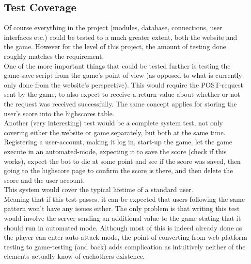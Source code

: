 \documentclass[12pt]{report}
\begin{document}
\subsection*{Test Coverage}
Of course everything in the project (modules, database, connections, user interfaces etc.) could be tested to a much greater extent, both the website and the game. However for the level of this project, the amount of testing done roughly matches the requirement.\\
One of the more important things that could be tested further is testing the game-save script from the game's point of view (as opposed to what is currently only done from the website's perspective). This would require the POST-request sent by the game, to also expect to receive a return value about whether or not the request was received successfully. The same concept applies for storing the user's score into the highscores table.\\
Another (very interesting) test would be a complete system test, not only covering either the website or game separately, but both at the same time. Registering a user-account, making it log in, start-up the game, let the game execute in an automated-mode, expecting it to save the score (check if this works), expect the bot to die at some point and see if the score was saved, then going to the highscore page to confirm the score is there, and then delete the score and the user account.\\
This system would cover the typical lifetime of a standard user.\\
Meaning that if this test passes, it can be expected that users following the same pattern won't have any issues either. The only problem is that writing this test would involve the server sending an additional value to the game stating that it should run in automated mode. Although most of this is indeed already done as the player can enter auto-attack mode, the point of converting from web-platform testing to game-testing (and back) adds complication as intuitively neither of the elements actually know of eachothers existence.
\end{document}
